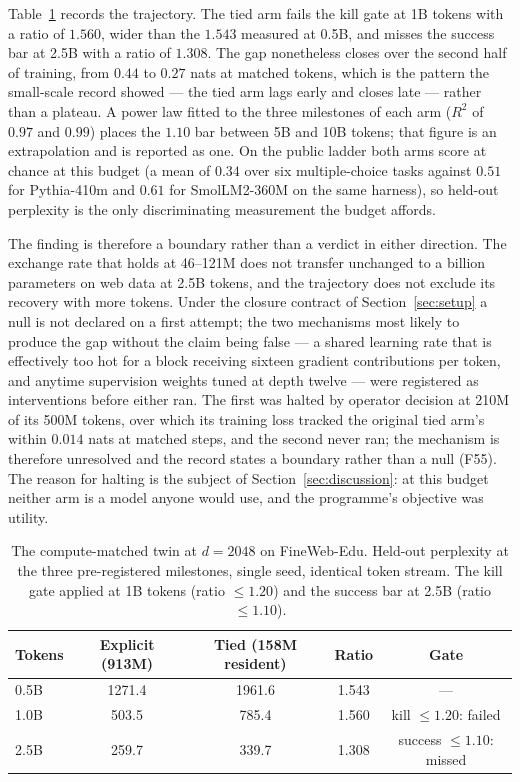 Table~\ref{tab:twin} records the trajectory. The tied arm fails the kill gate
at 1B tokens with a ratio of $1.560$, wider than the $1.543$ measured at 0.5B,
and misses the success bar at 2.5B with a ratio of $1.308$. The gap nonetheless
closes over the second half of training, from $0.44$ to $0.27$ nats at matched
tokens, which is the pattern the small-scale record showed --- the tied arm lags
early and closes late --- rather than a plateau. A power law fitted to the three
milestones of each arm ($R^2$ of $0.97$ and $0.99$) places the $1.10$ bar between
5B and 10B tokens; that figure is an extrapolation and is reported as one. On
the public ladder both arms score at chance at this budget (a mean of $0.34$
over six multiple-choice tasks against $0.51$ for Pythia-410m and $0.61$ for
SmolLM2-360M on the same harness), so held-out perplexity is the only
discriminating measurement the budget affords.

The finding is therefore a boundary rather than a verdict in either direction.
The exchange rate that holds at 46--121M does not transfer unchanged to a
billion parameters on web data at 2.5B tokens, and the trajectory does not
exclude its recovery with more tokens. Under the closure contract of
Section~\ref{sec:setup} a null is not declared on a first attempt; the
two mechanisms most likely to produce the gap without the claim being false ---
a shared learning rate that is effectively too hot for a block receiving
sixteen gradient contributions per token, and anytime supervision weights tuned
at depth twelve --- were registered as interventions before either ran. The
first was halted by operator decision at 210M of its 500M tokens, over which
its training loss tracked the original tied arm's within $0.014$ nats at matched
steps, and the second never ran; the mechanism is therefore unresolved and the
record states a boundary rather than a null (F55). The reason for halting is
the subject of Section~\ref{sec:discussion}: at this budget neither arm is a
model anyone would use, and the programme's objective was utility.

\begin{table}[t]
\centering
\caption{The compute-matched twin at $d = 2048$ on FineWeb-Edu. Held-out
perplexity at the three pre-registered milestones, single seed, identical token
stream. The kill gate applied at 1B tokens (ratio $\le 1.20$) and the success
bar at 2.5B (ratio $\le 1.10$).}
\label{tab:twin}
\begin{tabular}{lcccc}
\toprule
Tokens & Explicit (913M) & Tied (158M resident) & Ratio & Gate \\
\midrule
0.5B & 1271.4 & 1961.6 & 1.543 & --- \\
1.0B & 503.5  & 785.4  & 1.560 & kill $\le 1.20$: failed \\
2.5B & 259.7  & 339.7  & 1.308 & success $\le 1.10$: missed \\
\bottomrule
\end{tabular}
\end{table}

